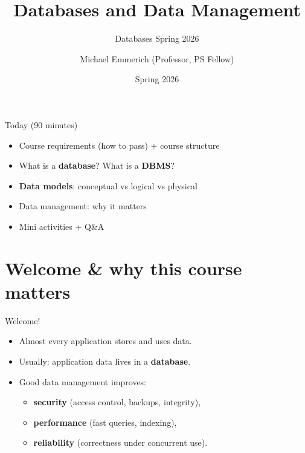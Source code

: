 \documentclass[10pt,aspectratio=169]{beamer}
\title{Databases and Data Management}
\subtitle{Databases Spring 2026}
\author{Michael Emmerich (Professor, PS Fellow)}
\institute{Faculty of Information Technology\\University of Jyväskylä}
\date{Spring 2026}
\begin{document}
\maketitle

\begin{frame}{Today (90 minutes)}
\begin{itemize}
  \item Course requirements (how to pass) + course structure
  \item What is a \textbf{database}? What is a \textbf{DBMS}?
  \item \textbf{Data models}: conceptual vs logical vs physical
  \item Data management: why it matters
  \item Mini activities + Q\&A
\end{itemize}
\end{frame}

\section{Welcome \& why this course matters}

\begin{frame}{Welcome!}
\begin{itemize}
  \item Almost every application stores and uses data.
  \item Usually: application data lives in a \textbf{database}.
  \item Good data management improves:
    \begin{itemize}
      \item \textbf{security} (access control, backups, integrity),
      \item \textbf{performance} (fast queries, indexing),
      \item \textbf{reliability} (correctness under concurrent use).
    \end{itemize}
\end{itemize}
\end{frame}
\end{document}

